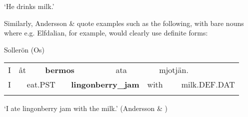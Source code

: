 \begin{styleTranslation}
‘He drinks milk.’ 

\end{styleTranslation}

\begin{styleBodyTextFirst}
Similarly, Andersson \& \citet{Danielsson1999} quote examples such as the following, with bare nouns where e.g. Elfdalian, for example, would clearly use definite forms:

\end{styleBodyTextFirst}

\begin{listWWNumileveli}
\item 

\begin{styleExample}
Sollerön (Os) 

\end{styleExample}

\end{listWWNumileveli}

\begin{listWWNumxxxleveli}
\item 

\end{listWWNumxxxleveli}

\begin{tabular}{llllllllll}
\lsptoprule
I & \multicolumn{2}{l}{åt

} & \multicolumn{2}{l}{{\bfseries bermos}

} & \multicolumn{2}{l}{ata

} & \multicolumn{2}{l}{mjotjän.

} & \\
\multicolumn{2}{l}{I

} & \multicolumn{2}{l}{eat.PST

} & \multicolumn{2}{l}{{\bfseries lingonberry\_jam}

} & \multicolumn{2}{l}{with

} & \multicolumn{2}{l}{milk.DEF.DAT

}\\
\lspbottomrule
\end{tabular}

\begin{styleTranslation}
‘I ate lingonberry jam with the milk.’ (Andersson \& \citet[373]{Danielsson1999})

\end{styleTranslation}

